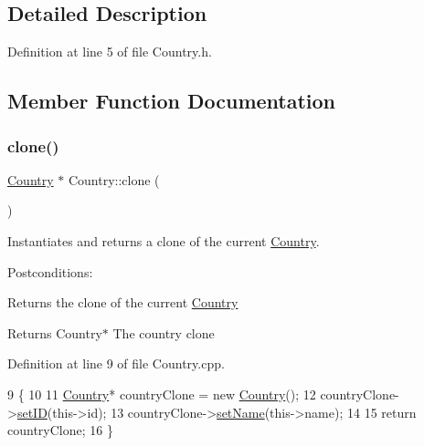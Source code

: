 \subsection{Detailed Description}


Definition at line 5 of file Country.\+h.



\subsection{Member Function Documentation}
\mbox{\label{classCountry_a82562b18230bbeceb22b13c0ab046a1c}} 
\subsubsection{\texorpdfstring{clone()}{clone()}}
{\footnotesize\ttfamily \hyperlink{classCountry}{Country} $\ast$ Country\+::clone (\begin{DoxyParamCaption}{ }\end{DoxyParamCaption})}



Instantiates and returns a clone of the current \hyperlink{classCountry}{Country}. 

Postconditions\+:
\begin{DoxyItemize}
\item Returns the clone of the current \hyperlink{classCountry}{Country}
\end{DoxyItemize}

\begin{DoxyReturn}{Returns}
Country$\ast$ The country clone 
\end{DoxyReturn}


Definition at line 9 of file Country.\+cpp.


\begin{DoxyCode}
9                        \{
10     
11     \hyperlink{classCountry}{Country}* countryClone = \textcolor{keyword}{new} \hyperlink{classCountry_a4cba457856775a13a17dfcb11a77e224}{Country}();
12     countryClone->\hyperlink{classCountry_a35ecd0419e6a6eaf358889527c280d82}{setID}(this->\textcolor{keywordtype}{id});
13     countryClone->\hyperlink{classCountry_ae4773ebfffe4f9d2d2db1b54181b67ab}{setName}(this->name);
14 
15     \textcolor{keywordflow}{return} countryClone;
16 \}
\end{DoxyCode}
\mbox{\label{classCountry_abb770576662c91a71c01cf078b98c0af}} 
